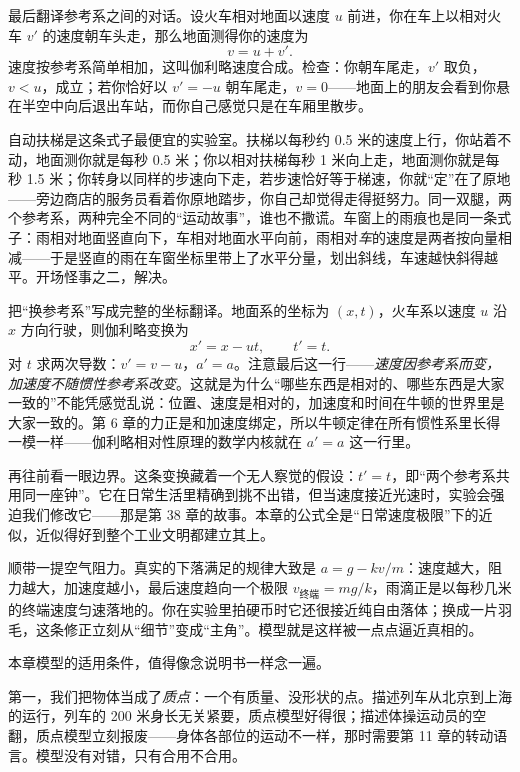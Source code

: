 \begin{mainline}
最后翻译参考系之间的对话。设火车相对地面以速度 \(u\) 前进，你在车上以相对火车 \(v'\) 的速度朝车头走，那么地面测得你的速度为
\[
  v=u+v'.
\]
速度按参考系简单相加，这叫伽利略速度合成。检查：你朝车尾走，\(v'\) 取负，\(v<u\)，成立；若你恰好以 \(v'=-u\) 朝车尾走，\(v=0\)——地面上的朋友会看到你悬在半空中向后退出车站，而你自己感觉只是在车厢里散步。

自动扶梯是这条式子最便宜的实验室。扶梯以每秒约 0.5 米的速度上行，你站着不动，地面测你就是每秒 0.5 米；你以相对扶梯每秒 1 米向上走，地面测你就是每秒 1.5 米；你转身以同样的步速向下走，若步速恰好等于梯速，你就“定”在了原地——旁边商店的服务员看着你原地踏步，你自己却觉得走得挺努力。同一双腿，两个参考系，两种完全不同的“运动故事”，谁也不撒谎。车窗上的雨痕也是同一条式子：雨相对地面竖直向下，车相对地面水平向前，雨相对\emph{车}的速度是两者按向量相减——于是竖直的雨在车窗坐标里带上了水平分量，划出斜线，车速越快斜得越平。开场怪事之二，解决。
\end{mainline}

\begin{challenge}
把“换参考系”写成完整的坐标翻译。地面系的坐标为 \((x,t)\)，火车系以速度 \(u\) 沿 \(x\) 方向行驶，则伽利略变换为
\[
  x'=x-ut,\qquad t'=t.
\]
对 \(t\) 求两次导数：\(v'=v-u\)，\(a'=a\)。注意最后这一行——\emph{速度因参考系而变，加速度不随惯性参考系改变}。这就是为什么“哪些东西是相对的、哪些东西是大家一致的”不能凭感觉乱说：位置、速度是相对的，加速度和时间在牛顿的世界里是大家一致的。第 6 章的力正是和加速度绑定，所以牛顿定律在所有惯性系里长得一模一样——伽利略相对性原理的数学内核就在 \(a'=a\) 这一行里。

再往前看一眼边界。这条变换藏着一个无人察觉的假设：\(t'=t\)，即“两个参考系共用同一座钟”。它在日常生活里精确到挑不出错，但当速度接近光速时，实验会强迫我们修改它——那是第 38 章的故事。本章的公式全是“日常速度极限”下的近似，近似得好到整个工业文明都建立其上。

顺带一提空气阻力。真实的下落满足的规律大致是 \(a=g-kv/m\)：速度越大，阻力越大，加速度越小，最后速度趋向一个极限 \(v_{\text{终端}}=mg/k\)，雨滴正是以每秒几米的终端速度匀速落地的。你在实验里拍硬币时它还很接近纯自由落体；换成一片羽毛，这条修正立刻从“细节”变成“主角”。模型就是这样被一点点逼近真相的。
\end{challenge}


本章模型的适用条件，值得像念说明书一样念一遍。

第一，我们把物体当成了\emph{质点}：一个有质量、没形状的点。描述列车从北京到上海的运行，列车的 200 米身长无关紧要，质点模型好得很；描述体操运动员的空翻，质点模型立刻报废——身体各部位的运动不一样，那时需要第 11 章的转动语言。模型没有对错，只有合用不合用。

